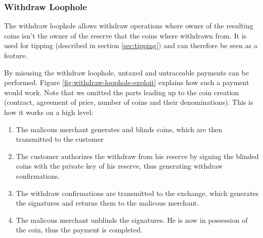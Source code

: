 \subsubsection{Withdraw Loophole}
\label{sec:withdraw-loophole}
The withdraw loophole allows withdraw operations where owner of the resulting coins isn't the owner of the reserve that the coins where withdrawn from.
It is used for tipping (described in section \ref{sec:tipping}) and can therefore be seen as a feature.

By misusing the withdraw loophole, untaxed and untraceable payments can be performed.
Figure \ref{fig:withdraw-loophole-exploit} explains how such a payment would work.
Note that we omitted the parts leading up to the coin creation (contract, agreement of price, number of coins and their denominations).
This is how it works on a high level:
\begin{enumerate}
    \item The malicous merchant generates and blinds coins, which are then transmitted to the customer
    \item The customer authorizes the withdraw from his reserve by signing the blinded coins with the private key of his reserve, thus generating withdraw confirmations.
    \item The withdraw confirmations are transmitted to the exchange, which generates the signatures and returns them to the malicous merchant.
    \item The malicous merchant unblinds the signatures.
          He is now in possession of the coin, thus the payment is completed.
\end{enumerate}

